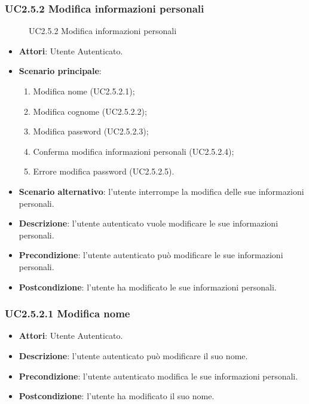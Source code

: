 \subsubsection{UC2.5.2 Modifica informazioni personali}
\begin{figure}[H]
\centering
\noindent{}
\caption{UC2.5.2 Modifica informazioni personali}
\end{figure}
\begin{itemize}
\item \textbf{Attori}: Utente Autenticato.
\item \textbf{Scenario principale}:
\begin{enumerate}
\item Modifica nome (UC2.5.2.1);
\item Modifica cognome (UC2.5.2.2);
\item Modifica password (UC2.5.2.3);
\item Conferma modifica informazioni personali (UC2.5.2.4);
\item Errore modifica password (UC2.5.2.5).
\end{enumerate}
\item \textbf{Scenario alternativo}: l'utente interrompe la modifica delle sue informazioni personali.
\item \textbf{Descrizione}: l'utente autenticato vuole modificare le sue informazioni personali.
\item \textbf{Precondizione}: l'utente autenticato può modificare le sue informazioni personali.
\item \textbf{Postcondizione}: l'utente ha modificato le sue informazioni personali.
\end{itemize}
\subsubsection{UC2.5.2.1 Modifica nome}
\begin{itemize}
\item \textbf{Attori}: Utente Autenticato.
\item \textbf{Descrizione}: l'utente autenticato può modificare il suo nome.
\item \textbf{Precondizione}: l'utente autenticato modifica le sue informazioni personali.
\item \textbf{Postcondizione}: l'utente ha modificato il suo nome.
\end{itemize}
